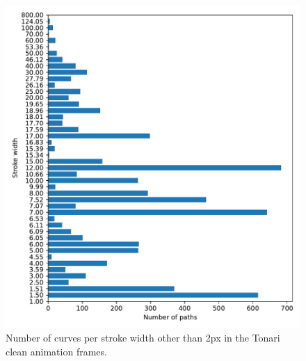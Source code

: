 \begin{figure}
    \includegraphics[width=\textwidth]{graphics/data_stats/stroke_width_counter.pdf}
    \caption{Number of curves per stroke width other than 2px in the Tonari clean animation frames.}
    \label{fig:diff.stroke.width}
\end{figure}

